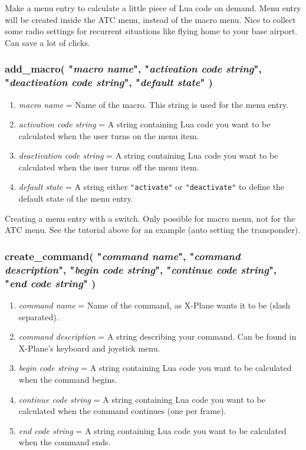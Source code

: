 \documentclass[11pt,parskip=half,a4paper]{scrartcl}
\begin{document}
Make a menu entry to calculate a little piece of Lua code on demand. Menu entry will be created inside the ATC menu, instead of the macro menu. Nice to collect some radio settings for recurrent situations like flying home to your base airport. Can save a lot of clicks.

\subsubsection{add\_macro( "\emph{macro name}", "\emph{activation code string}", "\emph{deactivation code string}", "\emph{default state}" )}

\begin{enumerate}
	\item \emph{macro name} = Name of the macro. This string is used for the menu entry.
	\item \emph{activation code string} = A string containing Lua code you want to be calculated when the user turns on the menu item.
	\item \emph{deactivation code string} = A string containing Lua code you want to be calculated when the user turns off the menu item.
	\item \emph{default state} = A string either \verb|"activate"| or \verb|"deactivate"| to define the default state of the menu entry.
\end{enumerate}

Creating a menu entry with a switch. Only possible for macro menu, not for the ATC menu. See the tutorial above for an example (auto setting the transponder).

\subsubsection{create\_command( "\emph{command name}", "\emph{command description}", "\emph{begin code string}", "\emph{continue code string}", "\emph{end code string}" )}

\begin{enumerate}
	\item \emph{command name} = Name of the command, as X-Plane wants it to be (slash separated).
	\item \emph{command description} = A string describing your command. Can be found in X-Plane's keyboard and joystick menu.
	\item \emph{begin code string} = A string containing Lua code you want to be calculated when the command begins.
	\item \emph{continue code string} = A string containing Lua code you want to be calculated when the command continues (one per frame).
	\item \emph{end code string} = A string containing Lua code you want to be calculated when the command ends.
\end{enumerate}
\end{document}
